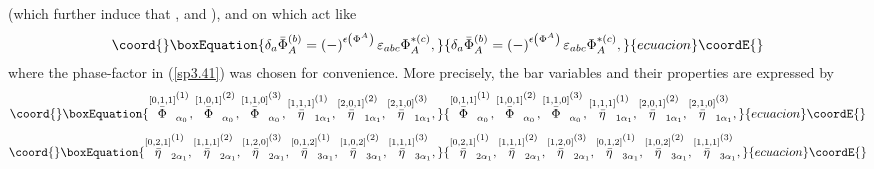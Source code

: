 \documentclass[a4paper,12pt]{article}
\begin{document}
(which further induce that \coordHE{}, and \coordHE{}), and on which \coordHE{} act like 
\begin{equation}\coord{}\boxEquation{
\delta _{a}\bar{\Phi}_{A}^{(b)}=\left( -\right) ^{\epsilon \left( \Phi
^{A}\right) }\varepsilon _{abc}\Phi _{A}^{*(c)},  \label{sp3.41}
}{
\delta _{a}\bar{\Phi}_{A}^{(b)}=\left( -\right) ^{\epsilon \left( \Phi
^{A}\right) }\varepsilon _{abc}\Phi _{A}^{*(c)},  }{ecuacion}\coordE{}\end{equation}
where the phase-factor in (\ref{sp3.41}) was chosen for convenience. More
precisely, the bar variables and their properties are expressed by 
\begin{equation}\coord{}\boxEquation{
\stackrel{\left[ 0,1,1\right] }{\bar{\Phi}}_{\alpha _{0}}^{(1)},\stackrel{
\left[ 1,0,1\right] }{\bar{\Phi}}_{\alpha _{0}}^{(2)},\stackrel{\left[
1,1,0\right] }{\bar{\Phi}}_{\alpha _{0}}^{(3)},\stackrel{\left[ 1,1,1\right] 
}{\bar{\eta}}_{1\alpha _{1}}^{(1)},\stackrel{\left[ 2,0,1\right] }{\bar{\eta}
}_{1\alpha _{1}}^{(2)},\stackrel{\left[ 2,1,0\right] }{\bar{\eta}}_{1\alpha
_{1}}^{(3)},  \label{sp3.42}
}{
\stackrel{\left[ 0,1,1\right] }{\bar{\Phi}}_{\alpha _{0}}^{(1)},\stackrel{
\left[ 1,0,1\right] }{\bar{\Phi}}_{\alpha _{0}}^{(2)},\stackrel{\left[
1,1,0\right] }{\bar{\Phi}}_{\alpha _{0}}^{(3)},\stackrel{\left[ 1,1,1\right] 
}{\bar{\eta}}_{1\alpha _{1}}^{(1)},\stackrel{\left[ 2,0,1\right] }{\bar{\eta}
}_{1\alpha _{1}}^{(2)},\stackrel{\left[ 2,1,0\right] }{\bar{\eta}}_{1\alpha
_{1}}^{(3)},  }{ecuacion}\coordE{}\end{equation}
\begin{equation}\coord{}\boxEquation{
\stackrel{\left[ 0,2,1\right] }{\bar{\eta}}_{2\alpha _{1}}^{(1)},\stackrel{
\left[ 1,1,1\right] }{\bar{\eta}}_{2\alpha _{1}}^{(2)},\stackrel{\left[
1,2,0\right] }{\bar{\eta}}_{2\alpha _{1}}^{(3)},\stackrel{\left[
0,1,2\right] }{\bar{\eta}}_{3\alpha _{1}}^{(1)},\stackrel{\left[
1,0,2\right] }{\bar{\eta}}_{3\alpha _{1}}^{(2)},\stackrel{\left[
1,1,1\right] }{\bar{\eta}}_{3\alpha _{1}}^{(3)},  \label{sp3.43}
}{
\stackrel{\left[ 0,2,1\right] }{\bar{\eta}}_{2\alpha _{1}}^{(1)},\stackrel{
\left[ 1,1,1\right] }{\bar{\eta}}_{2\alpha _{1}}^{(2)},\stackrel{\left[
1,2,0\right] }{\bar{\eta}}_{2\alpha _{1}}^{(3)},\stackrel{\left[
0,1,2\right] }{\bar{\eta}}_{3\alpha _{1}}^{(1)},\stackrel{\left[
1,0,2\right] }{\bar{\eta}}_{3\alpha _{1}}^{(2)},\stackrel{\left[
1,1,1\right] }{\bar{\eta}}_{3\alpha _{1}}^{(3)},  }{ecuacion}\coordE{}\end{equation}
\end{document}
